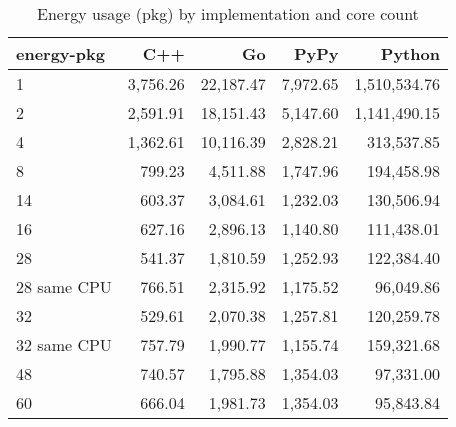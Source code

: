 \begin{table}
    \centering
    \begin{tabular}{lrrrr}
        \hline
        energy-pkg     & C++        & Go         & PyPy       & Python        \\
        \hline
        1              & 3,756.26   & 22,187.47  & 7,972.65   & 1,510,534.76  \\
        2              & 2,591.91   & 18,151.43  & 5,147.60   & 1,141,490.15  \\
        4              & 1,362.61   & 10,116.39  & 2,828.21   &   313,537.85  \\
        8	             &   799.23 	& 4,511.88	 & 1,747.96   &	  194,458.98  \\ 
        14             &   603.37   &  3,084.61  & 1,232.03   &   130,506.94  \\
        16             &   627.16   &  2,896.13  & 1,140.80   &   111,438.01  \\
        28             &   541.37   &  1,810.59  & 1,252.93   &   122,384.40  \\
        28 same CPU    &   766.51   &  2,315.92  & 1,175.52   &    96,049.86  \\
        32             &   529.61   &  2,070.38  & 1,257.81   &   120,259.78  \\
        32 same CPU    &   757.79   &  1,990.77  & 1,155.74   &   159,321.68  \\
        48             &   740.57   &  1,795.88  & 1,354.03   &    97,331.00  \\
        60             &   666.04   &  1,981.73  & 1,354.03   &    95,843.84  \\
        \hline
    \end{tabular}
    \caption{Energy usage (pkg) by implementation and core count}
\label{tab:server-energy-pkg}
\end{table}
